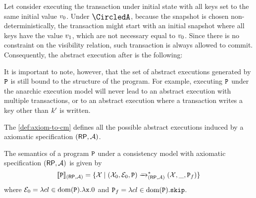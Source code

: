 
Let consider executing the transaction under initial state with all keys set to the same initial value \( v_0 \).
Under $\anarchicCM$, because the snapshot is chosen non-deterministically, 
the transaction might start with an initial snapshot where all keys have the value \( v_1 \),
which are not necessary equal to \( v_0 \).
Since there is no constraint on the visibility relation,
such transaction is always allowed to commit.
Consequently, the abstract execution after is the following: 
\begin{center}
\end{center}

It is important to note, however, that the set of abstract executions generated by $\mathtt{P}$ 
is still bound to the structure of the program.
For example, executing $\mathtt{P}$ under the anarchic execution model will never lead to 
an abstract execution with multiple transactions, 
or to an abstract execution where a transaction writes a key other than $k'$ is written.

The \cref{def:axiom-to-cm} defines all the possible abstract executions 
induced by a axiomatic specification $(\mathsf{RP}, \mathcal{A})$.

\begin{definition}
\label{def:axiom-to-cm}
\label{def:axiom-to-prog}
The semantics of a program $\mathtt{P}$ under a consistency model with axiomatic specification 
$(\mathsf{RP}, \mathcal{A})$ is given by 
\[
\llbracket \mathtt{P} \rrbracket_{(\mathsf{RP}, \mathcal{A})} = \{ \mathcal{X} \mid (\mathcal{X}_{0}, \mathcal E_{0}, \mathtt{P}) \xrightarrow{\_}_{(\mathsf{RP}, \mathcal{A})}^{\ast} (\mathcal{X}, \_, \mathtt{P}_{f}) \}
\]
where $\mathcal E_{0} = \lambda {\ensuremath{cl}} \in \operatorname{dom}(\mathtt{P}).\lambda \mathtt{x}.0$ and $\mathtt{P}_{f} = \lambda {\ensuremath{cl}} \in \operatorname{dom}(\mathtt{P}).\mathtt{skip}$.
\end{definition}

